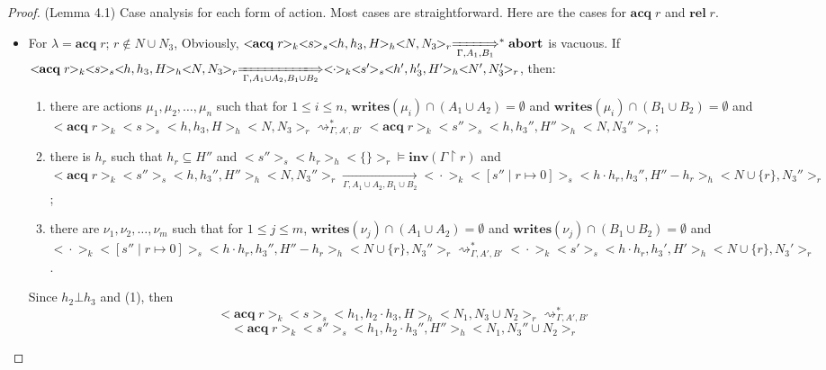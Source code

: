\documentclass{lmcs} %
\theoremstyle{plain}\newtheorem{satz}[thm]{Satz} %
\begin{document}
\section{}
\begin{proof}{(Lemma 4.1)}
Case analysis for each form of action. Most cases are straightforward. Here are the cases for $\mathbf{acq}\;r$ and $\mathbf{rel}\;r$.
\begin{itemize}
  \item For $\lambda=\mathbf{acq}\;r$; $r\notin N\cup N_3$,
  Obviously, $<\!\!\mathbf{acq}\;r\!\!>_k<\!\!s\!\!>_s<\!\!h,h_3,H\!\!>_h<\!\!N,N_3\!\!>_r\xLongrightarrow[\Gamma, A_1,B_1]{}^*\mathbf{abort}$ is vacuous. If $<\!\!\mathbf{acq}\;r\!\!>_k<\!\!s\!\!>_s<\!\!h,h_3,H\!\!>_h<\!\!N,N_3\!\!>_r\xLongrightarrow[\Gamma, A_1\cup A_2, B_1\cup B_2]{}<\!\!\cdot\!\!>_k<\!\!s'\!\!>_s<\!\!h',h_3',H'\!\!>_h<\!\!N',N_3'\!\!>_r$,
  then:
  \begin{enumerate}
    \item there are actions $\mu_1,\mu_2,\ldots,\mu_n$ such that for $1\leq i\leq n$, $\mathbf{writes}(\mu_i)\cap (A_1\cup A_2) =\emptyset$ and $\mathbf{writes}(\mu_i)\cap (B_1\cup B_2) =\emptyset$ and
  $<\!\!\mathbf{acq}\;r\!\!>_k<\!\!s\!\!>_s<\!\!h,h_3,H\!\!>_h<\!\!N,N_3\!\!>_r\rightsquigarrow_{\Gamma, A' ,B'}^*<\!\!\mathbf{acq}\;r\!\!>_k<\!\!s''\!\!>_s<\!\!h,h_3'',H''\!\!>_h<\!\!N,N_3''\!\!>_r$;
    \item there is $h_r$ such that $h_r \subseteq H''$ and $<\!\!s''\!\!>_s<\!\!h_r\!\!>_h<\!\!\{\}\!\!>_r\models \mathbf{inv}(\Gamma\upharpoonright r)$ and $<\!\!\mathbf{acq}\;r\!\!>_k<\!\!s''\!\!>_s<\!\!h,h_3'',H''\!\!>_h<\!\!N,N_3''\!\!>_r\xrightarrow[\Gamma, A_1\cup A_2,B_1\cup B_2]{}<\!\!\cdot\!\!>_k<\!\![s''\mid r\mapsto 0]\!\!>_s<\!\!h\cdot h_r,h_3'',H''-h_r\!\!>_h<\!\!N\cup\{r\},N_3''\!\!>_r$;
    \item there are $\nu_1,\nu_2,\ldots,\nu_m$ such that for $1\leq j\leq m$, $\mathbf{writes}(\nu_j)\cap (A_1\cup A_2) =\emptyset$ and $\mathbf{writes}(\nu_j)\cap (B_1\cup B_2) =\emptyset$ and $<\!\!\cdot\!\!>_k<\!\![s''\mid r\mapsto 0]\!\!>_s<\!\!h\cdot h_r,h_3'',H''-h_r\!\!>_h<\!\!N\cup\{r\},N_3''\!\!>_r\rightsquigarrow_{\Gamma, A' ,B'}^*<\!\!\cdot\!\!>_k<\!\!s'\!\!>_s<\!\!h\cdot h_r,h_3',H'\!\!>_h<\!\!N\cup\{r\},N_3'\!\!>_r$.
  \end{enumerate}
  Since $h_2\bot h_3$ and (1), then
  $$<\!\!\mathbf{acq}\;r\!\!>_k<\!\!s\!\!>_s<\!\!h_1,h_2\cdot h_3,H\!\!>_h<\!\!N_1,N_3\cup N_2\!\!>_r\rightsquigarrow_{\Gamma, A' ,B'}^*$$
  $$<\!\!\mathbf{acq}\;r\!\!>_k<\!\!s''\!\!>_s<\!\!h_1,h_2\cdot h_3'',H''\!\!>_h<\!\!N_1,N_3''\cup N_2\!\!>_r$$

\end{itemize}
\end{proof}
\end{document}
